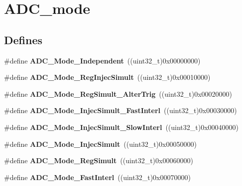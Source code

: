 \hypertarget{group__ADC__mode}{
\section{ADC\_\-mode}
\label{group__ADC__mode}
}
\subsection*{Defines}
\begin{DoxyCompactItemize}
\item 
\hypertarget{group__ADC__mode_ga2754d3a35559dc10e3d6a7d920e83432}{
\#define {\bfseries ADC\_\-Mode\_\-Independent}~((uint32\_\-t)0x00000000)}
\label{group__ADC__mode_ga2754d3a35559dc10e3d6a7d920e83432}

\item 
\hypertarget{group__ADC__mode_ga487d5f0c506291c5d37b53198396fd1c}{
\#define {\bfseries ADC\_\-Mode\_\-RegInjecSimult}~((uint32\_\-t)0x00010000)}
\label{group__ADC__mode_ga487d5f0c506291c5d37b53198396fd1c}

\item 
\hypertarget{group__ADC__mode_gae3d5fbf93f60d75534364bf9db78f632}{
\#define {\bfseries ADC\_\-Mode\_\-RegSimult\_\-AlterTrig}~((uint32\_\-t)0x00020000)}
\label{group__ADC__mode_gae3d5fbf93f60d75534364bf9db78f632}

\item 
\hypertarget{group__ADC__mode_ga2fc8a737f7b2375309bccbcb7fdbbfeb}{
\#define {\bfseries ADC\_\-Mode\_\-InjecSimult\_\-FastInterl}~((uint32\_\-t)0x00030000)}
\label{group__ADC__mode_ga2fc8a737f7b2375309bccbcb7fdbbfeb}

\item 
\hypertarget{group__ADC__mode_gacb72230cb48a577907729d426be69c22}{
\#define {\bfseries ADC\_\-Mode\_\-InjecSimult\_\-SlowInterl}~((uint32\_\-t)0x00040000)}
\label{group__ADC__mode_gacb72230cb48a577907729d426be69c22}

\item 
\hypertarget{group__ADC__mode_ga2339cc471aaf2db02daa4aeb49e9f0d9}{
\#define {\bfseries ADC\_\-Mode\_\-InjecSimult}~((uint32\_\-t)0x00050000)}
\label{group__ADC__mode_ga2339cc471aaf2db02daa4aeb49e9f0d9}

\item 
\hypertarget{group__ADC__mode_ga71298f7453c2b4392a9c622328b3c93d}{
\#define {\bfseries ADC\_\-Mode\_\-RegSimult}~((uint32\_\-t)0x00060000)}
\label{group__ADC__mode_ga71298f7453c2b4392a9c622328b3c93d}

\item 
\hypertarget{group__ADC__mode_ga843ecdd53625e2088e91819e43106a7a}{
\#define {\bfseries ADC\_\-Mode\_\-FastInterl}~((uint32\_\-t)0x00070000)}
\label{group__ADC__mode_ga843ecdd53625e2088e91819e43106a7a}


\end{DoxyCompactItemize}
